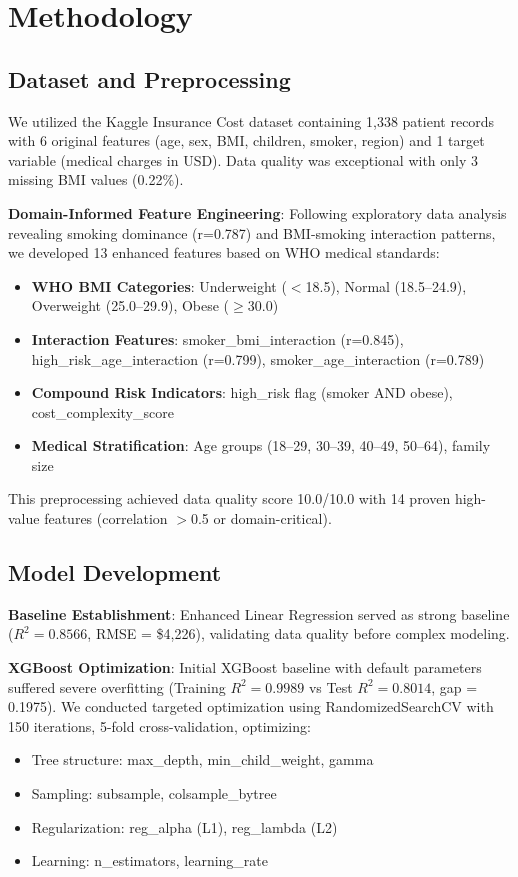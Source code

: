 \documentclass[conference]{IEEEtran}
\begin{document}
\section{Methodology}

\subsection{Dataset and Preprocessing}
We utilized the Kaggle Insurance Cost dataset containing 1,338 patient records with 6 original features (age, sex, BMI, children, smoker, region) and 1 target variable (medical charges in USD). Data quality was exceptional with only 3 missing BMI values (0.22\%).

\textbf{Domain-Informed Feature Engineering}: Following exploratory data analysis revealing smoking dominance (r=0.787) and BMI-smoking interaction patterns, we developed 13 enhanced features based on WHO medical standards:

\begin{itemize}
\item \textbf{WHO BMI Categories}: Underweight ($<$18.5), Normal (18.5--24.9), Overweight (25.0--29.9), Obese ($\geq$30.0)
\item \textbf{Interaction Features}: smoker\_bmi\_interaction (r=0.845), high\_risk\_age\_interaction (r=0.799), smoker\_age\_interaction (r=0.789)
\item \textbf{Compound Risk Indicators}: high\_risk flag (smoker AND obese), cost\_complexity\_score
\item \textbf{Medical Stratification}: Age groups (18--29, 30--39, 40--49, 50--64), family size
\end{itemize}

This preprocessing achieved data quality score 10.0/10.0 with 14 proven high-value features (correlation $>$0.5 or domain-critical).

\subsection{Model Development}

\textbf{Baseline Establishment}: Enhanced Linear Regression served as strong baseline ($R^2 = 0.8566$, RMSE = \$4,226), validating data quality before complex modeling.

\textbf{XGBoost Optimization}: Initial XGBoost baseline with default parameters suffered severe overfitting (Training $R^2 = 0.9989$ vs Test $R^2 = 0.8014$, gap = 0.1975). We conducted targeted optimization using RandomizedSearchCV with 150 iterations, 5-fold cross-validation, optimizing:
\begin{itemize}
\item Tree structure: max\_depth, min\_child\_weight, gamma
\item Sampling: subsample, colsample\_bytree
\item Regularization: reg\_alpha (L1), reg\_lambda (L2)
\item Learning: n\_estimators, learning\_rate
\end{itemize}
\end{document}
